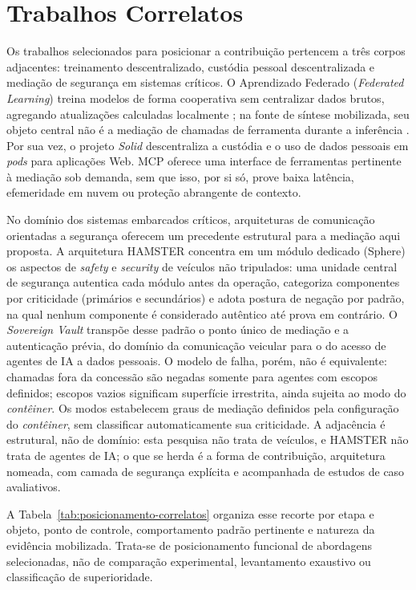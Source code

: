 \section{Trabalhos Correlatos}
Os trabalhos selecionados para posicionar a contribuição pertencem a três corpos adjacentes: treinamento descentralizado, custódia pessoal descentralizada e mediação de segurança em sistemas críticos. O Aprendizado Federado (\textit{Federated Learning}) treina modelos de forma cooperativa sem centralizar dados brutos, agregando atualizações calculadas localmente \cite{mcmahan2017,mammen2021}; na fonte de síntese mobilizada, seu objeto central não é a mediação de chamadas de ferramenta durante a inferência \cite{mammen2021}. Por sua vez, o projeto \textit{Solid} \cite{sambra2016} descentraliza a custódia e o uso de dados pessoais em \textit{pods} para aplicações Web. MCP oferece uma interface de ferramentas pertinente à mediação sob demanda, sem que isso, por si só, prove baixa latência, efemeridade em nuvem ou proteção abrangente de contexto.

No domínio dos sistemas embarcados críticos, arquiteturas de comunicação orientadas a segurança oferecem um precedente estrutural para a mediação aqui proposta. A arquitetura HAMSTER \cite{pigatto2016} concentra em um módulo dedicado (Sphere) os aspectos de \textit{safety} e \textit{security} de veículos não tripulados: uma unidade central de segurança autentica cada módulo antes da operação, categoriza componentes por criticidade (primários e secundários) e adota postura de negação por padrão, na qual nenhum componente é considerado autêntico até prova em contrário. O \textit{Sovereign Vault} transpõe desse padrão o ponto único de mediação e a autenticação prévia, do domínio da comunicação veicular para o do acesso de agentes de IA a dados pessoais. O modelo de falha, porém, não é equivalente: chamadas fora da concessão são negadas somente para agentes com escopos definidos; escopos vazios significam superfície irrestrita, ainda sujeita ao modo do \textit{contêiner}. Os modos estabelecem graus de mediação definidos pela configuração do \textit{contêiner}, sem classificar automaticamente sua criticidade. A adjacência é estrutural, não de domínio: esta pesquisa não trata de veículos, e HAMSTER não trata de agentes de IA; o que se herda é a forma de contribuição, arquitetura nomeada, com camada de segurança explícita e acompanhada de estudos de caso avaliativos.

A Tabela~\ref{tab:posicionamento-correlatos} organiza esse recorte por etapa e objeto, ponto de controle, comportamento padrão pertinente e natureza da evidência mobilizada. Trata-se de posicionamento funcional de abordagens selecionadas, não de comparação experimental, levantamento exaustivo ou classificação de superioridade.

